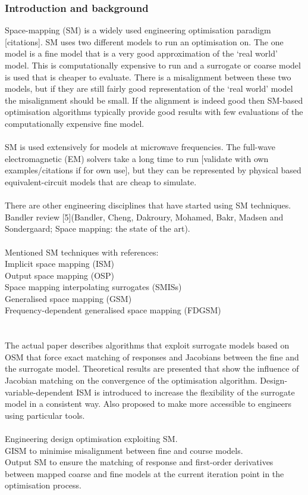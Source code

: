 \subsubsection*{Introduction and background}
Space-mapping (SM) is a widely used engineering optimisation paradigm [citations].
SM uses two different models to run an optimisation on. The one model is a fine model that is a very good approximation of the `real world' model. This is computationally expensive to run and a surrogate or coarse model is used that is cheaper to evaluate. There is a misalignment between these two models, but if they are still fairly good representation of the `real world' model the misalignment should be small. If the alignment is indeed good then SM-based optimisation algorithms typically provide good results with few evaluations of the computationally expensive fine model. 
\\ \\
SM is used extensively for models at microwave frequencies. The full-wave electromagnetic (EM) solvers take a long time to run [validate with own examples/citations if for own use], but they can be represented by physical based equivalent-circuit models that are cheap to simulate. 
\\ \\
There are other engineering disciplines that have started using SM techniques. Bandler review [5](Bandler, Cheng, Dakroury, Mohamed, Bakr, Madsen and Sondergaard; Space mapping: the state of the art).
\\ \\
Mentioned SM techniques with references:\\
Implicit space mapping (ISM)\\
Output space mapping (OSP)\\
Space mapping interpolating surrogates (SMISs)\\
Generalised space mapping (GSM)\\
Frequency-dependent generalised space mapping (FDGSM)\\
\\ \\
The actual paper describes algorithms that exploit surrogate models based on OSM that force exact matching of responses and Jacobians between the fine and the surrogate model. Theoretical results are presented that show the influence of Jacobian matching on the convergence of the optimisation algorithm. Design-variable-dependent ISM is introduced to increase the flexibility of the surrogate model in a consistent way. Also proposed to make more accessible to engineers using particular tools. 
\\ \\
Engineering design optimisation exploiting SM. \\
GISM to minimise misalignment between fine and course models.\\
Output SM to ensure the matching of response and first-order derivatives between mapped coarse and fine models at the current iteration point in the optimisation process.\\

